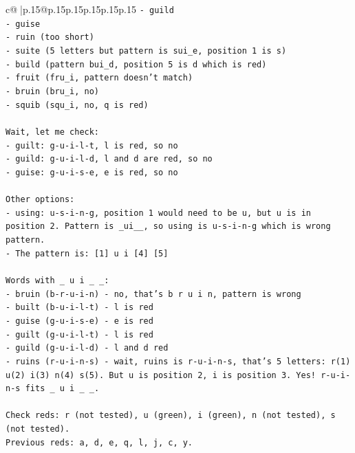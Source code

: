 \documentclass{article}
\begin{document}
{\begin{supertabular}{c@{$\;$}|p{.15\linewidth}@{}p{.15\linewidth}p{.15\linewidth}p{.15\linewidth}p{.15\linewidth}p{.15\linewidth}}
{{{\texttt{{-} guild} \\
\texttt{{-} guise} \\
\texttt{{-} ruin (too short)} \\
\texttt{{-} suite (5 letters but pattern is sui\_e, position 1 is s)} \\
\texttt{{-} build (pattern bui\_d, position 5 is d which is red)} \\
\texttt{{-} fruit (fru\_i, pattern doesn't match)} \\
\texttt{{-} bruin (bru\_i, no)} \\
\texttt{{-} squib (squ\_i, no, q is red)} \\
\\ 
\texttt{Wait, let me check:} \\
\texttt{{-} guilt: g{-}u{-}i{-}l{-}t, l is red, so no} \\
\texttt{{-} guild: g{-}u{-}i{-}l{-}d, l and d are red, so no} \\
\texttt{{-} guise: g{-}u{-}i{-}s{-}e, e is red, so no} \\
\\ 
\texttt{Other options:} \\
\texttt{{-} using: u{-}s{-}i{-}n{-}g, position 1 would need to be u, but u is in position 2. Pattern is \_ui\_\_, so using is u{-}s{-}i{-}n{-}g which is wrong pattern.} \\
\texttt{{-} The pattern is: {[}1{]} u i {[}4{]} {[}5{]}} \\
\\ 
\texttt{Words with \_ u i \_ \_:} \\
\texttt{{-} bruin (b{-}r{-}u{-}i{-}n) {-} no, that's b r u i n, pattern is wrong} \\
\texttt{{-} built (b{-}u{-}i{-}l{-}t) {-} l is red} \\
\texttt{{-} guise (g{-}u{-}i{-}s{-}e) {-} e is red} \\
\texttt{{-} guilt (g{-}u{-}i{-}l{-}t) {-} l is red} \\
\texttt{{-} guild (g{-}u{-}i{-}l{-}d) {-} l and d red} \\
\texttt{{-} ruins (r{-}u{-}i{-}n{-}s) {-} wait, ruins is r{-}u{-}i{-}n{-}s, that's 5 letters: r(1) u(2) i(3) n(4) s(5). But u is position 2, i is position 3. Yes! r{-}u{-}i{-}n{-}s fits \_ u i \_ \_.} \\
\\ 
\texttt{Check reds: r (not tested), u (green), i (green), n (not tested), s (not tested).} \\
\texttt{Previous reds: a, d, e, q, l, j, c, y.} \\
}}}
\end{supertabular}}
\end{document}
